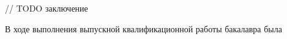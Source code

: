 
// TODO заключение

В ходе выполнения выпускной квалификационной работы бакалавра была 

\clearpage
